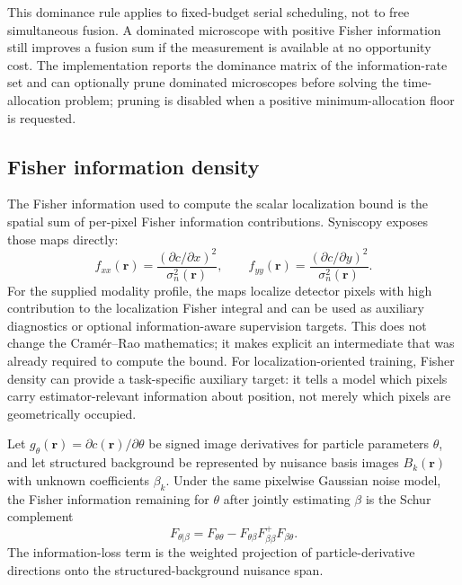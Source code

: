 This dominance rule applies to fixed-budget serial scheduling, not to free simultaneous fusion. A dominated microscope with positive Fisher information still improves a fusion sum if the measurement is available at no opportunity cost. The implementation reports the dominance matrix of the information-rate set and can optionally prune dominated microscopes before solving the time-allocation problem; pruning is disabled when a positive minimum-allocation floor is requested.

\subsection{Fisher information density}

The Fisher information used to compute the scalar localization bound is the spatial sum of per-pixel Fisher information contributions. Syniscopy exposes those maps directly:
\begin{equation}
  f_{xx}(\mathbf{r}) =
  \frac{(\partial c/\partial x)^2}{\sigma_n^2(\mathbf{r})},
  \qquad
  f_{yy}(\mathbf{r}) =
  \frac{(\partial c/\partial y)^2}{\sigma_n^2(\mathbf{r})}.
\end{equation}
For the supplied modality profile, the maps localize detector pixels with high contribution to the localization Fisher integral and can be used as auxiliary diagnostics or optional information-aware supervision targets. This does not change the Cram\'{e}r--Rao mathematics; it makes explicit an intermediate that was already required to compute the bound. For localization-oriented training, Fisher density can provide a task-specific auxiliary target: it tells a model which pixels carry estimator-relevant information about position, not merely which pixels are geometrically occupied.

\begin{remark}
\label{rem:structured-background-fisher}
Let $g_\theta(\mathbf{r})=\partial c(\mathbf{r})/\partial\theta$ be signed image derivatives for particle parameters $\theta$, and let structured background be represented by nuisance basis images $B_k(\mathbf{r})$ with unknown coefficients $\beta_k$. Under the same pixelwise Gaussian noise model, the Fisher information remaining for $\theta$ after jointly estimating $\beta$ is the Schur complement
\begin{equation}
  F_{\theta|\beta}
  =
  F_{\theta\theta}
  -
  F_{\theta\beta}F_{\beta\beta}^{+}F_{\beta\theta}.
\end{equation}
The information-loss term is the weighted projection of particle-derivative directions onto the structured-background nuisance span.
\end{remark}


